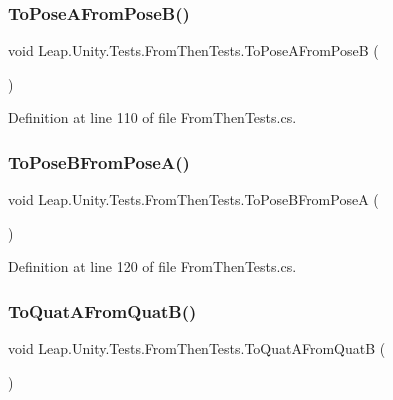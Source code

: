 \subsubsection{\texorpdfstring{ToPoseAFromPoseB()}{ToPoseAFromPoseB()}}
{\footnotesize\ttfamily void Leap.\+Unity.\+Tests.\+From\+Then\+Tests.\+To\+Pose\+A\+From\+PoseB (\begin{DoxyParamCaption}{ }\end{DoxyParamCaption})}



Definition at line 110 of file From\+Then\+Tests.\+cs.

\mbox{\label{class_leap_1_1_unity_1_1_tests_1_1_from_then_tests_a509f04a79a3457852d987aeac2c5e3ed}} 
\subsubsection{\texorpdfstring{ToPoseBFromPoseA()}{ToPoseBFromPoseA()}}
{\footnotesize\ttfamily void Leap.\+Unity.\+Tests.\+From\+Then\+Tests.\+To\+Pose\+B\+From\+PoseA (\begin{DoxyParamCaption}{ }\end{DoxyParamCaption})}



Definition at line 120 of file From\+Then\+Tests.\+cs.

\mbox{\label{class_leap_1_1_unity_1_1_tests_1_1_from_then_tests_a5e156d5526c6eac53248cf13b6d4af58}} 
\subsubsection{\texorpdfstring{ToQuatAFromQuatB()}{ToQuatAFromQuatB()}}
{\footnotesize\ttfamily void Leap.\+Unity.\+Tests.\+From\+Then\+Tests.\+To\+Quat\+A\+From\+QuatB (\begin{DoxyParamCaption}{ }\end{DoxyParamCaption})}



